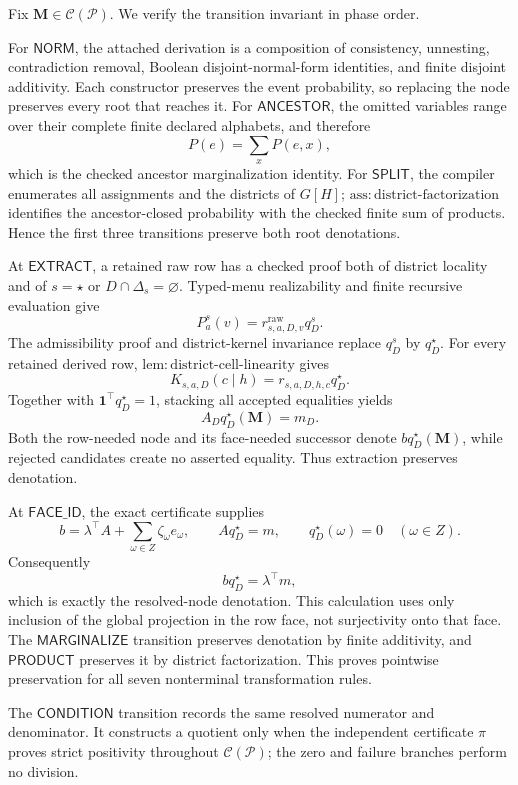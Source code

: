 Fix \(\mathbf M\in\mathcal C(\mathcal P)\). We verify the transition invariant in phase order.

For \(\mathsf{NORM}\), the attached derivation is a composition of consistency, unnesting, contradiction removal, Boolean disjoint-normal-form identities, and finite disjoint additivity. Each constructor preserves the event probability, so replacing the node preserves every root that reaches it. For \(\mathsf{ANCESTOR}\), the omitted variables range over their complete finite declared alphabets, and therefore
\[
P(e)=\sum_xP(e,x),
\]
which is the checked ancestor marginalization identity. For \(\mathsf{SPLIT}\), the compiler enumerates all assignments and the districts of \(G[H]\); \(\mathrm{ass:district\text{-}factorization}\) identifies the ancestor-closed probability with the checked finite sum of products. Hence the first three transitions preserve both root denotations.

At \(\mathsf{EXTRACT}\), a retained raw row has a checked proof both of district locality and of \(s=\star\) or \(D\cap\Delta_s=\varnothing\). Typed-menu realizability and finite recursive evaluation give
\[
P_a^s(v)=r^{\mathrm{raw}}_{s,a,D,v}q_D^s.
\]
The admissibility proof and district-kernel invariance replace \(q_D^s\) by \(q_D^\star\). For every retained derived row, \(\mathrm{lem:district\text{-}cell\text{-}linearity}\) gives
\[
K_{s,a,D}(c\mid h)=r_{s,a,D,h,c}q_D^\star.
\]
Together with \(\mathbf 1^\top q_D^\star=1\), stacking all accepted equalities yields
\[
A_Dq_D^\star(\mathbf M)=m_D.
\]
Both the row-needed node and its face-needed successor denote \(bq_D^\star(\mathbf M)\), while rejected candidates create no asserted equality. Thus extraction preserves denotation.

At \(\mathsf{FACE\_ID}\), the exact certificate supplies
\[
b=\lambda^\top A+\sum_{\omega\in Z}\zeta_\omega e_\omega,
\qquad Aq_D^\star=m,
\qquad q_D^\star(\omega)=0\quad(\omega\in Z).
\]
Consequently
\[
bq_D^\star=\lambda^\top m,
\]
which is exactly the resolved-node denotation. This calculation uses only inclusion of the global projection in the row face, not surjectivity onto that face. The \(\mathsf{MARGINALIZE}\) transition preserves denotation by finite additivity, and \(\mathsf{PRODUCT}\) preserves it by district factorization. This proves pointwise preservation for all seven nonterminal transformation rules.

The \(\mathsf{CONDITION}\) transition records the same resolved numerator and denominator. It constructs a quotient only when the independent certificate \(\pi\) proves strict positivity throughout \(\mathcal C(\mathcal P)\); the zero and failure branches perform no division.

